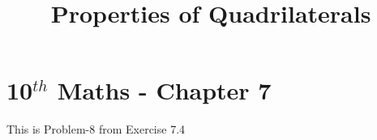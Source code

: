 \documentclass[12pt]{article}
\begin{document}
\begin{center}
\title{\textbf{Properties of Quadrilaterals}}
\date{\vspace{-5ex}} %
\maketitle
\end{center}

\setcounter{page}{1}



\section{10$^{th}$ Maths - Chapter 7}

This is Problem-8 from Exercise 7.4
\end{document}
